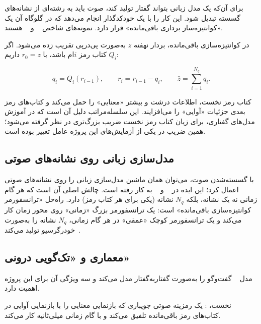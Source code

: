 برای آن‌که یک مدل زبانی بتواند گفتار تولید کند، صوت باید به رشته‌ای از
نشانه‌های گسسته تبدیل شود.  این کار را با یک
خودکدگذار انجام می‌دهد که در گلوگاه آن یک
«کوانتیزه‌ساز برداری باقی‌مانده»
قرار دارد. نمونه‌های شاخص ~\cite{zeghidour2021soundstream} و
~\cite{defossez2023encodec} هستند.

در کوانتیزه‌سازی باقی‌مانده، بردار نهفته $z$ به‌صورت پی‌درپی تقریب زده
می‌شود. اگر $Q_i$ کتاب رمز $i$‌ام باشد، با $r_0 = z$ داریم:

\begin{equation}
q_i = Q_i(r_{i-1}), \qquad r_i = r_{i-1} - q_i, \qquad
\hat{z} = \sum_{i=1}^{N_q} q_i .
\label{eq:rvq}
\end{equation}

کتاب رمز نخست، اطلاعات درشت و بیشتر «معنایی» را حمل می‌کند و
کتاب‌های رمز بعدی جزئیات «آوایی» را می‌افزایند. این سلسله‌مراتب دلیل
آن است که در آموزش مدل‌های گفتاری، برای زیان کتاب رمز نخست ضریب بزرگ‌تری
در نظر گرفته می‌شود؛ همین ضریب در یکی از آزمایش‌های این پروژه عامل تغییر
بوده است.

\subsection{مدل‌سازی زبانی روی نشانه‌های صوتی}

با گسسته‌شدن صوت، می‌توان همان ماشین مدل‌سازی زبانی را روی نشانه‌های صوتی
اعمال کرد؛ این ایده در ~\cite{borsos2023audiolm} و
~\cite{wang2023valle} به کار رفته است. چالش اصلی آن است که هر گام
زمانی نه یک نشانه، بلکه $N_q$ نشانه (یکی برای هر کتاب رمز) دارد. راه‌حل
«ترانسفورمر کوانتیزه‌سازی باقی‌مانده» است: یک
ترانسفورمر بزرگ «زمانی» روی محور زمان کار می‌کند و یک ترانسفورمر کوچک
«عمقی» در هر گام زمانی، $N_q$ نشانه را به‌صورت خودرگرسیو
تولید می‌کند~\cite{lee2022rqvae}.

\subsection{معماری  و «تک‌گویی درونی»}
\label{sec:moshi-arch}

مدل ~\cite{defossez2024moshi} گفت‌وگو را به‌صورت
گفتار‌به‌گفتار مدل می‌کند و سه ویژگی آن برای این پروژه اهمیت دارد.

نخست، : یک رمزینه صوتی جویباری که بازنمایی معنایی را
با بازنمایی آوایی در کتاب‌های رمز باقی‌مانده تلفیق می‌کند و با گام زمانی
 میلی‌ثانیه کار می‌کند.

